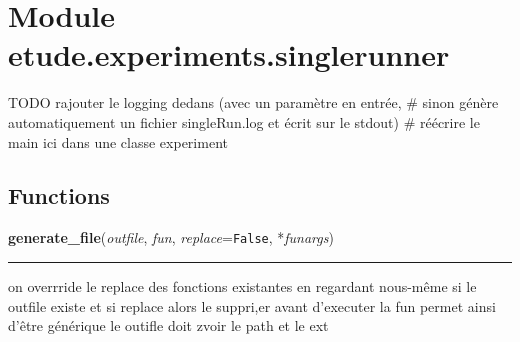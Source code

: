 %
%
%


\section{Module etude.experiments.singlerunner}

    \label{etude:experiments:singlerunner}
TODO rajouter le logging dedans (avec un paramètre en entrée, \# sinon 
génère automatiquement un fichier singleRun.log et écrit sur le stdout) \# 
réécrire le main ici dans une classe experiment



  \subsection{Functions}

    \label{etude:experiments:singlerunner:generate_file}

    \vspace{0.5ex}

\hspace{.8\funcindent}\begin{boxedminipage}{\funcwidth}

    \raggedright \textbf{generate\_file}(\textit{outfile}, \textit{fun}, \textit{replace}={\tt False}, *\textit{funargs})

    \vspace{-1.5ex}

    \rule{\textwidth}{0.5\fboxrule}
\setlength{\parskip}{2ex}
    on overrride le replace des fonctions existantes en regardant nous-même
    si le outfile existe et si replace alors le suppri,er avant d'executer 
    la fun permet ainsi d'être générique le outifle doit zvoir le path et 
    le ext

\setlength{\parskip}{1ex}
    \end{boxedminipage}

